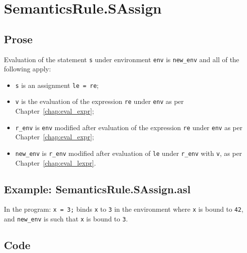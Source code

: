 \documentclass{book}
\begin{document}

\section{SemanticsRule.SAssign \label{sec:SemanticsRule.SAssign}}

  \subsection{Prose}
  Evaluation of the statement \texttt{s} under environment \texttt{env} is
\texttt{new\_env} and all of the following apply:
  \begin{itemize}
  \item \texttt{s} is an assignment \texttt{le = re};
  \item \texttt{v} is the evaluation of the expression \texttt{re} under \texttt{env} as per Chapter~\ref{chap:eval_expr};
  \item \texttt{r\_env} is \texttt{env} modified after evaluation of the expression \texttt{re} under \texttt{env} as per Chapter~\ref{chap:eval_expr};
  \item \texttt{new\_env} is \texttt{r\_env} modified after evaluation of \texttt{le} under \texttt{r\_env} with
    \texttt{v}, as per Chapter~\ref{chap:eval_lexpr}.
  \end{itemize}

  \subsection{Example: SemanticsRule.SAssign.asl}
  In the program:
  \texttt{x = 3;} binds \texttt{x} to \texttt{3} in the environment where \texttt{x} is bound to \texttt{42}, and \texttt{new\_env} is such that \texttt{x} is bound to \texttt{3}.

  \subsection{Code}
\end{document}
